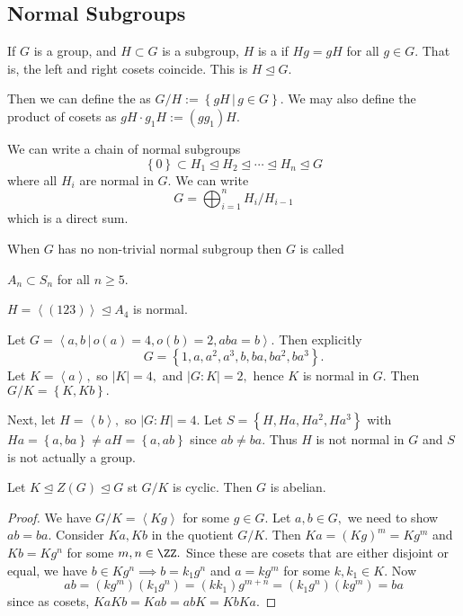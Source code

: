 \documentclass{article}
\begin{document}
\subsection{Normal Subgroups}

\begin{definition}
	If $G$ is a group, and $H\subset G$ is a subgroup, $H$ is a  if $Hg=gH$ for all $g\in G.$ That is, the left and right cosets coincide. This is $H\unlhd G.$
\end{definition}

Then we can define the  as $G/H:=\left\{ gH\, |\, g\in G \right\}.$ We may also define the product of cosets as $gH\cdot g_1H:=(gg_1)H.$ 

We can write a chain of normal subgroups \[\left\{ 0 \right\}\subset H_1\unlhd H_2\unlhd \cdots \unlhd H_n\unlhd G\] where all $H_i$ are normal in $G.$ We can write \[G=\bigoplus_{i=1}^n H_i/H_{i-1}\] which is a direct sum.

\begin{definition}
	When $G$ has no non-trivial normal subgroup then $G$ is called  
\end{definition}

\begin{example*}
	$A_n\subset S_n$ for all $n\ge 5$.
\end{example*}

\begin{remark*}
	$H=\left< (123)\right>\unlhd A_4$ is normal.
\end{remark*}

\begin{example*}
	Let $G=\left< a, b\, |\, o(a)=4, o(b)=2, aba=b\right>.$ Then explicitly \[G=\left\{ 1, a, a^2, a^3, b, ba, ba^2, ba^3 \right\}.\] Let $K=\left< a\right>,$ so $|K|=4,$ and $|G:K|=2,$ hence $K$ is normal in $G.$ Then $G/K=\left\{ K, Kb \right\}.$ 
	
	Next, let $H=\left< b\right>,$ so $|G:H|=4.$ Let $S=\left\{ H, Ha, Ha^2, Ha^3 \right\}$ with $Ha=\left\{ a, ba \right\}\neq aH=\left\{ a, ab \right\}$ since $ab\neq ba.$ Thus $H$ is not normal in $G$ and $S$ is not actually a group.
\end{example*}

\begin{theorem*}
	Let $K\unlhd Z(G)\unlhd G$ st $G/K$ is cyclic. Then $G$ is abelian.
\end{theorem*}

\begin{proof}
	We have $G/K=\left< Kg\right>$ for some $g\in G.$ Let $a, b\in G,$ we need to show $ab=ba.$ Consider $Ka, Kb$ in the quotient $G/K.$ Then $Ka=(Kg)^m=Kg^m$ and $Kb=Kg^n$ for some $m, n\in\ZZ.$ Since these are cosets that are either disjoint or equal, we have $b\in Kg^n\implies b=k_1g^n$ and $a=kg^m$ for some $k, k_1\in K.$ Now \[ab=(kg^m)(k_1g^n)=(kk_1)g^{m+n}=(k_1g^n)(kg^m)=ba\] since as cosets, $KaKb=Kab=abK=KbKa.$ 
\end{proof}
\end{document}
